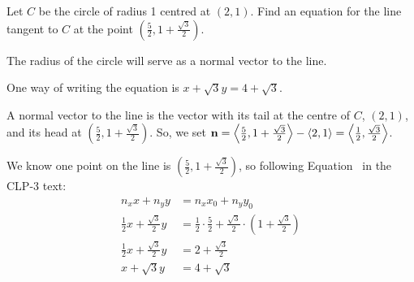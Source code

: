 \begin{question}
Let $C$ be the circle of radius 1 centred at $(2,1)$. Find an equation for the line tangent to $C$ at the point $\left(\frac{5}{2},1+\frac{\sqrt3}{2}\right)$.
\end{question}
\begin{hint}
The radius of the circle will serve as a normal vector to the line.
\end{hint}
\begin{answer}
One way of writing the equation is $x+{\sqrt3}y=4+{\sqrt3}$.
\end{answer}
\begin{solution}
A normal vector to the line is the vector with its tail at the centre of $C$, $(2,1)$, and its head at $\left(\frac{5}{2},1+\frac{\sqrt3}{2}\right)$. 
So, we set $\mathbf{n}=\left< \frac{5}{2},1+\frac{\sqrt3}{2} \right>-\left< 2,1\right> = 
\left< \frac12, \frac{\sqrt3}{2}\right>$.


\begin{center}
\end{center}

We know one point on the line is $\left(\frac{5}{2},1+\frac{\sqrt3}{2}\right)$, so following Equation~  in the CLP-3 text:
\begin{align*}
n_xx+n_yy&=n_xx_0+n_yy_0\\
\frac12x+\frac{\sqrt3}{2}y&=\frac12\cdot\frac52+\frac{\sqrt3}{2}\cdot\left(1+\frac{\sqrt3}{2}\right)\\
\frac12x+\frac{\sqrt3}{2}y&=2+\frac{\sqrt3}{2}\\
x+{\sqrt3}y&=4+{\sqrt3}\\
\end{align*}
\end{solution}

